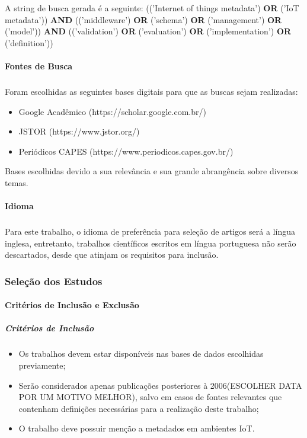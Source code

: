 A string de busca gerada é a seguinte:
(('Internet of things metadata') \textbf{OR} ('IoT metadata')) \textbf{AND} (('middleware') \textbf{OR} ('schema') \textbf{OR} ('management') \textbf{OR} ('model')) \textbf{AND} (('validation') \textbf{OR} ('evaluation') \textbf{OR} ('implementation') \textbf{OR} ('definition'))

\paragraph{Fontes de Busca}
\subparagraph{}
Foram escolhidas as seguintes bases digitais para que as buscas sejam realizadas:
\begin{itemize}
  \item Google Acadêmico (https://scholar.google.com.br/)
  \item JSTOR (https://www.jstor.org/)
  \item Periódicos CAPES (https://www.periodicos.capes.gov.br/) 
\end{itemize}
Bases escolhidas devido a sua relevância e sua grande abrangência sobre diversos temas.

\paragraph{Idioma}
\subparagraph{}
Para este trabalho, o idioma de preferência para seleção de artigos será a língua inglesa, entretanto, trabalhos científicos escritos em
língua portuguesa não serão descartados, desde que atinjam os requisitos para inclusão.

\subsubsection{Seleção dos Estudos}
\paragraph{Critérios de Inclusão e Exclusão}
\subparagraph{Critérios de Inclusão}
\begin{itemize}
  \item Os trabalhos devem estar disponíveis nas bases de dados escolhidas previamente;
  \item Serão considerados apenas publicações posteriores à 2006{\color{red}(ESCOLHER DATA POR UM MOTIVO MELHOR)}, salvo em casos de fontes relevantes que contenham definições necessárias para a realização deste trabalho;
  \item O trabalho deve possuir menção a metadados em ambientes \acrlong{IoT}.
\end{itemize}

